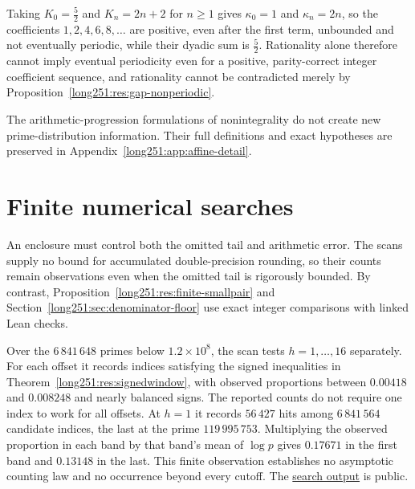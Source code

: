 \noindent Taking $K_0=\tfrac52$ and $K_n=2n+2$ for $n\ge1$ gives
$\kappa_0=1$ and $\kappa_n=2n$, so the coefficients $1,2,4,6,8,\ldots$ are
positive, even after the first term, unbounded and not eventually periodic,
while their dyadic sum is $\tfrac52$.  Rationality alone therefore cannot imply
eventual periodicity even for a positive, parity-correct integer coefficient
sequence, and rationality cannot be contradicted merely by
Proposition~\ref{long251:res:gap-nonperiodic}.

The arithmetic-progression formulations of nonintegrality do not create new
prime-distribution information.  Their full definitions and exact
hypotheses are preserved in Appendix~\ref{long251:app:affine-detail}.

\section{Finite numerical searches}\label{long251:sec:measurements}

An enclosure must control both the omitted tail and arithmetic error.
The scans supply no bound for accumulated double-precision rounding, so
their counts remain observations even when the omitted tail is rigorously
bounded.  By contrast, Proposition~\ref{long251:res:finite-smallpair} and
Section~\ref{long251:sec:denominator-floor} use exact integer comparisons
with linked Lean checks.

Over the $6\,841\,648$ primes below $1.2\times10^{8}$, the scan tests
$h=1,\ldots,16$ separately.  For each offset it records indices satisfying
the signed inequalities in Theorem~\ref{long251:res:signedwindow}, with
observed proportions between $0.00418$ and $0.008248$ and nearly balanced
signs.  The reported counts do not require one index to work for all offsets.  At $h=1$ it records $56\,427$ hits among $6\,841\,564$ candidate
indices, the last at the prime $119\,995\,753$.  Multiplying the observed proportion in each band
by that band's mean of $\log p$ gives $0.17671$ in the first band and
$0.13148$ in the last.
This finite observation establishes no asymptotic counting law and no
occurrence beyond every cutoff.  The
\href{https://github.com/wcook04/plectis-erdos/blob/dd6cc708f650f061de06594eba6ba43878f4de31/research/experiments/erdos251/receipts/adjacent-mismatch.json}{search output}
is public.

